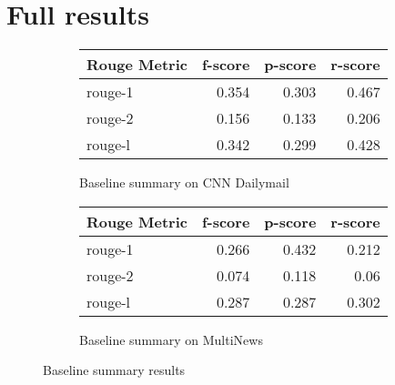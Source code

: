 \documentclass[../writeup.tex]{subfiles}
\begin{document}
\appendix


\chapter{Full results}\label{chapter:results}

\begin{figure}[H]
    \centering
    \begin{subfigure}{0.5\linewidth}
        \begin{tabular}{lrrr}
            \hline
            Rouge Metric & f-score & p-score & r-score \\
            \hline
            rouge-1      & 0.354   & 0.303   & 0.467   \\
            rouge-2      & 0.156   & 0.133   & 0.206   \\
            rouge-l      & 0.342   & 0.299   & 0.428   \\
            \hline
        \end{tabular}
        \caption{Baseline summary on CNN Dailymail}
    \end{subfigure}%
    \begin{subfigure}{0.5\linewidth}
        \begin{tabular}{lrrr}
            \hline
            Rouge Metric & f-score & p-score & r-score \\
            \hline
            rouge-1      & 0.266   & 0.432   & 0.212   \\
            rouge-2      & 0.074   & 0.118   & 0.06    \\
            rouge-l      & 0.287   & 0.287   & 0.302   \\
            \hline
        \end{tabular}
        \caption{Baseline summary on MultiNews}
    \end{subfigure}
    \caption{Baseline summary results}
    \label{appendix:fig:results:baseline_full}
\end{figure}
\end{document}
